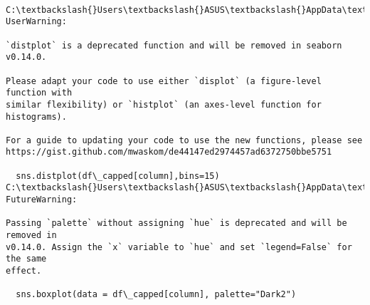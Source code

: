 \documentclass[11pt]{article}
\begin{document}
    \begin{center}
    \end{center}
    { \hspace*{\fill} \\}
    
    \begin{Verbatim}[commandchars=\\\{\}]
C:\textbackslash{}Users\textbackslash{}ASUS\textbackslash{}AppData\textbackslash{}Local\textbackslash{}Temp\textbackslash{}ipykernel\_1856\textbackslash{}3437602839.py:5: UserWarning:

`distplot` is a deprecated function and will be removed in seaborn v0.14.0.

Please adapt your code to use either `displot` (a figure-level function with
similar flexibility) or `histplot` (an axes-level function for histograms).

For a guide to updating your code to use the new functions, please see
https://gist.github.com/mwaskom/de44147ed2974457ad6372750bbe5751

  sns.distplot(df\_capped[column],bins=15)
C:\textbackslash{}Users\textbackslash{}ASUS\textbackslash{}AppData\textbackslash{}Local\textbackslash{}Temp\textbackslash{}ipykernel\_1856\textbackslash{}3437602839.py:8: FutureWarning:

Passing `palette` without assigning `hue` is deprecated and will be removed in
v0.14.0. Assign the `x` variable to `hue` and set `legend=False` for the same
effect.

  sns.boxplot(data = df\_capped[column], palette="Dark2")
    \end{Verbatim}

    \begin{center}
    \end{center}
    { \hspace*{\fill} \\}
    
\end{document}
